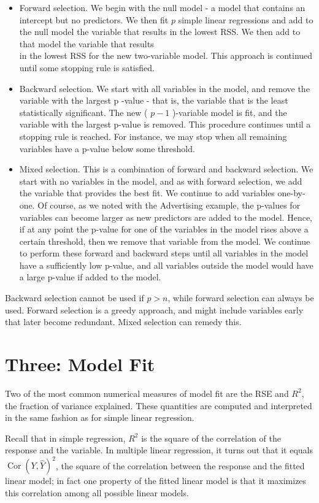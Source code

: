 \documentclass[10pt]{article}
\begin{document}
\begin{itemize}
  \item Forward selection. We begin with the null model - a model that contains an intercept but no predictors. We then fit $p$ simple linear regressions and add to the null model the variable that results in the lowest RSS. We then add to that model the variable that results\\
in the lowest RSS for the new two-variable model. This approach is continued until some stopping rule is satisfied.
  \item Backward selection. We start with all variables in the model, and remove the variable with the largest p -value - that is, the variable that is the least statistically significant. The new ( $p-1$ )-variable model is fit, and the variable with the largest p-value is removed. This procedure continues until a stopping rule is reached. For instance, we may stop when all remaining variables have a p-value below some threshold.
  \item Mixed selection. This is a combination of forward and backward selection. We start with no variables in the model, and as with forward selection, we add the variable that provides the best fit. We continue to add variables one-by-one. Of course, as we noted with the Advertising example, the p-values for variables can become larger as new predictors are added to the model. Hence, if at any point the p-value for one of the variables in the model rises above a certain threshold, then we remove that variable from the model. We continue to perform these forward and backward steps until all variables in the model have a sufficiently low p-value, and all variables outside the model would have a large p-value if added to the model.
\end{itemize}

Backward selection cannot be used if $p>n$, while forward selection can always be used. Forward selection is a greedy approach, and might include variables early that later become redundant. Mixed selection can remedy this.

\section*{Three: Model Fit}
Two of the most common numerical measures of model fit are the RSE and $R^{2}$, the fraction of variance explained. These quantities are computed and interpreted in the same fashion as for simple linear regression.

Recall that in simple regression, $R^{2}$ is the square of the correlation of the response and the variable. In multiple linear regression, it turns out that it equals $\operatorname{Cor}(Y, \hat{Y})^{2}$, the square of the correlation between the response and the fitted linear model; in fact one property of the fitted linear model is that it maximizes this correlation among all possible linear models.
\end{document}
